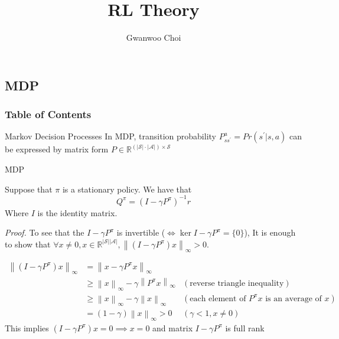 \documentclass[8pt]{beamer}
\title{RL Theory}
\author{Gwanwoo Choi}
\newcommand{\mbb}[1]{\mathbb{#1}}
\newcommand{\mc}[1]{\mathcal{#1}}
\newcommand{\ti}[1]{\textit{#1}}
\newcommand{\abs}[1]{\left\lvert #1 \right\rvert}
\newcommand{\norm}[1]{\left\lVert #1 \right\rVert}
\begin{document}
\begin{frame}
    \titlepage
\end{frame}


\subsection{MDP}

\begin{frame}
    \frametitle{Table of Contents}
    \tableofcontents[currentsubsection]
\end{frame}


\begin{frame}{Markov Decision Processes}
    In MDP, transition probability $P_{s s^\prime}^a = Pr(s^\prime | s,a)$ can be expressed by matrix form $P \in \mbb{R}^{(\abs{\mathcal{S}} \cdot \abs{\mathcal{A}}) \times \mathcal{S}}$

\end{frame}


\begin{frame}{MDP}
    \begin{corollary}
        Suppose that $\pi$ is a stationary policy. We have that
        \[
        Q^\pi = (I - \gamma P^\pi)^{-1} r
        \]
        Where $I$ is the identity matrix.
    \end{corollary}

    \ti{Proof.}
    To see that the $I - \gamma P^\pi$ is invertible ($\iff \ker{I - \gamma P^\pi} = \{0\}$), It is enough to show that $\forall x \neq 0, x \in \mbb{R}^{\abs{\mc{S}}\abs{\mc{A}}}, \norm{(I - \gamma P^\pi) x}_\infty > 0$.

    \[
    \begin{aligned}
        \norm{(I - \gamma P^\pi)x}_\infty &= \norm{x - \gamma P^\pi x}_\infty \\ &\geq \norm{x}_\infty - \gamma \norm{P^\pi x}_\infty &(\text{reverse triangle inequality})\\
        &\geq \norm{x}_\infty - \gamma \norm{x}_\infty &(\text{each element of }P^\pi x\text{ is an average of }x ) \\
        &=(1-\gamma) \norm{x}_\infty > 0 &(\gamma < 1, x \neq 0)
    \end{aligned}
    \]
    This implies $(I - \gamma P^\pi)x = 0 \implies x = 0$ and matrix $I - \gamma P^\pi$ is full rank
\end{frame}
\end{document}
